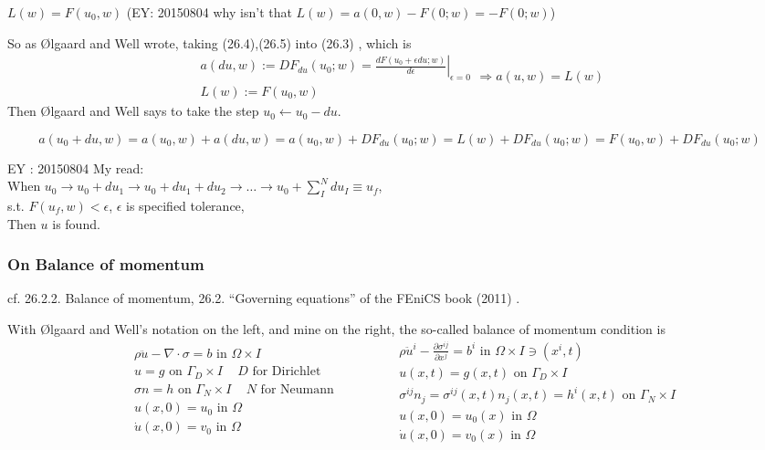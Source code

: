 \documentclass[twoside,landscape,10pt]{amsart}
\theoremstyle{plain}
\theoremstyle{definition}
\theoremstyle{remark}
\begin{document}
\begin{multicols*}{2}
$L(w) = F(u_0,w)$ (EY: 20150804 why isn't that $L(w) = a(0,w) - F(0;w) = -F(0;w)$)

So as \O lgaard and Well wrote, taking (26.4),(26.5) into (26.3) \cite{FEniCS}, which is 
\[
\begin{gathered}
  a(du,w) := DF_{du}(u_0;w) = \left. \frac{dF(u_0 + \epsilon du;w)}{d\epsilon} \right|_{\epsilon=0} \\
  L(w) := F(u_0,w)
\end{gathered} \Longrightarrow a(u,w) = L(w)
\]
Then \O lgaard and Well says to take the step $u_0 \leftarrow u_0 -du$.  

\[
a(u_0 + du,w) = a(u_0,w) + a(du,w) = a(u_0,w) + DF_{du}(u_0;w) = L(w) + DF_{du}(u_0;w) = F(u_0,w) + DF_{du}(u_0;w)
\]

EY : 20150804 My read: \\
When $u_0 \to u_0 + du_1 \to u_0 + du_1 + du_2 \to \dots \to u_0 + \sum_{I}^N du_I \equiv u_f$, \\
\phantom{When} s.t. $F(u_f,w) < \epsilon$, $\epsilon$ is specified tolerance, \\
Then $u$ is found. 

\subsubsection{On Balance of momentum}

cf. 26.2.2. Balance of momentum, 26.2. ``Governing equations'' of the FEniCS book (2011) \cite{FEniCS}.  

With \O lgaard and Well's notation on the left, and mine on the right, the so-called balance of momentum condition is
\[
\begin{aligned}
  & \rho \ddot{u} - \nabla \cdot \sigma = b \text{ in } \Omega \times I \\
  & u = g \text{ on } \Gamma_D \times I \quad \, \text{$D$ for Dirichlet } \\ 
  & \sigma n = h \text{ on } \Gamma_N \times I \quad \, \text{$N$ for Neumann } \\ 
  & u(x,0) = u_0 \text{ in } \Omega \\
 & \dot{u}(x,0) = v_0 \text{ in } \Omega
\end{aligned} \quad \quad \quad \, 
\begin{aligned}
& \rho \ddot{u}^i - \frac{ \partial \sigma^{ij} }{ \partial x^j} = b^i \text { in } \Omega \times I \ni (x^i,t) \\ 
 & u(x,t) = g(x,t) \text{ on } \Gamma_D \times I \\ 
 & \sigma^{ij}n_j = \sigma^{ij}(x,t)n_j (x,t) = h^i(x,t) \text{ on } \Gamma_N \times I \\
 & u(x,0) = u_0(x) \text{ in } \Omega \\
& \dot{u}(x,0) = v_0(x) \text{ in } \Omega
\end{aligned}
\]


\end{multicols*}
\end{document}
